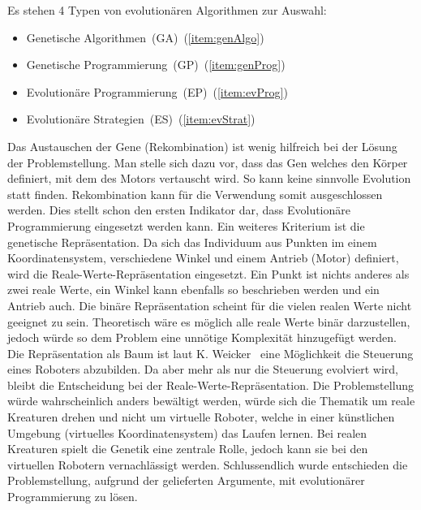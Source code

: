     Es stehen 4 Typen von evolutionären Algorithmen zur Auswahl:

    \begin{itemize}
      \item Genetische Algorithmen~(GA)~(\vref{item:genAlgo})
      \item Genetische Programmierung~(GP)~(\vref{item:genProg})
      \item Evolutionäre Programmierung~(EP)~(\vref{item:evProg})
      \item Evolutionäre Strategien~(ES)~(\vref{item:evStrat})
    \end{itemize}


    Das Austauschen der Gene (Rekombination) ist wenig hilfreich bei der Lösung der Problemstellung.
    Man stelle sich dazu vor, dass das Gen welches den Körper definiert, mit dem des Motors vertauscht wird.
    So kann keine sinnvolle Evolution statt finden.
    Rekombination kann für die Verwendung somit ausgeschlossen werden.
    Dies stellt schon den ersten Indikator dar,
    dass Evolutionäre Programmierung eingesetzt werden kann.
    Ein weiteres Kriterium ist die genetische Repräsentation.
    Da sich das Individuum aus Punkten im einem Koordinatensystem,
    verschiedene Winkel und einem Antrieb (Motor) definiert, wird die Reale-Werte-Repräsentation eingesetzt.
    Ein Punkt ist nichts anderes als zwei reale Werte,
    ein Winkel kann ebenfalls so beschrieben werden und ein Antrieb auch.
    Die binäre Repräsentation scheint für die vielen realen Werte nicht geeignet zu sein.
    Theoretisch wäre es möglich alle reale Werte binär darzustellen, jedoch würde so dem Problem eine unnötige Komplexität hinzugefügt werden.
    Die Repräsentation als Baum ist laut K. Weicker~\cite{book:evAlgo} eine Möglichkeit die Steuerung eines Roboters abzubilden.
    Da aber mehr als nur die Steuerung evolviert wird, bleibt die Entscheidung bei der Reale-Werte-Repräsentation.
    Die Problemstellung würde wahrscheinlich anders bewältigt werden,
    würde sich die Thematik um reale Kreaturen drehen und nicht um virtuelle Roboter,
    welche in einer künstlichen Umgebung (virtuelles Koordinatensystem) das Laufen lernen.
    Bei realen Kreaturen spielt die Genetik eine zentrale Rolle, jedoch kann sie bei den virtuellen Robotern vernachlässigt werden.
    Schlussendlich wurde entschieden die Problemstellung, aufgrund der gelieferten Argumente, mit evolutionärer Programmierung zu lösen.

